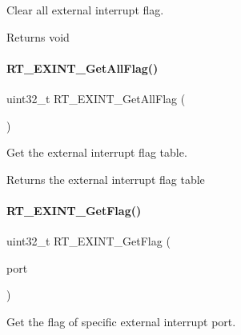 Clear all external interrupt flag. 

\begin{DoxyReturn}{Returns}
void 
\end{DoxyReturn}
\mbox{\label{a00011_a89b52c64e3041f59ff80bcc0a4682015}} 
\paragraph{\texorpdfstring{R\+T\+\_\+\+E\+X\+I\+N\+T\+\_\+\+Get\+All\+Flag()}{RT\_EXINT\_GetAllFlag()}}
{\footnotesize\ttfamily uint32\+\_\+t R\+T\+\_\+\+E\+X\+I\+N\+T\+\_\+\+Get\+All\+Flag (\begin{DoxyParamCaption}{ }\end{DoxyParamCaption})\hspace{0.3cm}{\ttfamily [inline]}}



Get the external interrupt flag table. 

\begin{DoxyReturn}{Returns}
the external interrupt flag table 
\end{DoxyReturn}
\mbox{\label{a00011_a359121bf1f9306a694a4958cb14f6e61}} 
\paragraph{\texorpdfstring{R\+T\+\_\+\+E\+X\+I\+N\+T\+\_\+\+Get\+Flag()}{RT\_EXINT\_GetFlag()}}
{\footnotesize\ttfamily uint32\+\_\+t R\+T\+\_\+\+E\+X\+I\+N\+T\+\_\+\+Get\+Flag (\begin{DoxyParamCaption}\item[{port}]{ }\end{DoxyParamCaption})\hspace{0.3cm}{\ttfamily [inline]}}



Get the flag of specific external interrupt port. 

